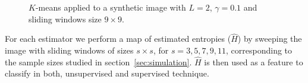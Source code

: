 \documentclass[journal]{IEEEtran}
\begin{document}
\begin{figure}[hbt]
    \centering
	\caption{$K$-means applied to a synthetic image with $L=2$, $\gamma=0.1$ and  sliding windows size $9 \times 9$.} 
\end{figure}  

For each estimator we perform a map of estimated entropies ($\hat{H}$) by sweeping the image with sliding windows of sizes $s\times s$, for $s=3,5,7,9,11$, corresponding to the sample sizes studied in section~\ref{sec:simulation}. $\hat{H}$ is then used as a feature to classify in both, unsupervised and supervised technique.
\end{document}
